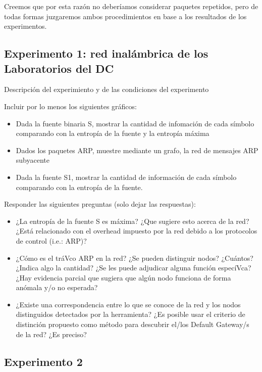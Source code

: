 \par Creemos que por esta razón no deberíamos considerar paquetes repetidos, pero de todas formas juzgaremos ambos procedimientos en base a los resultados de los experimentos.

\subsection{Experimento 1: red inalámbrica de los Laboratorios del DC}

Descripci\'on del experimiento y de las condiciones del experimento

Incluir por lo menos los siguientes gr\'aficos:

\begin{itemize}
	\item Dada la fuente binaria S, mostrar la cantidad de infomación de cada símbolo comparando con la entropía de la fuente y la entropía máxima
	\item Dados los paquetes ARP, muestre mediante un grafo, la red de mensajes ARP subyacente
	\item Dada la fuente S1, mostrar la cantidad de información de cada símbolo comparando con la entropía de la fuente.
\end{itemize}

Responder las siguientes preguntas (solo dejar las respuestas):

\begin{itemize}
	\item ¿La entropía de la fuente S es máxima? ¿Que sugiere esto acerca de la red? ¿Está relacionado con el overhead impuesto por la red debido a los protocolos de control (i.e.: ARP)?
	\item ¿Cómo es el tráVco ARP en la red? ¿Se pueden distinguir nodos? ¿Cuántos? ¿Indica algo la cantidad? ¿Se les puede adjudicar alguna función especíVca? ¿Hay evidencia parcial que sugiera que algún nodo funciona de forma anómala y/o no esperada?
	\item ¿Existe una correspondencia entre lo que se conoce de la red y los nodos distinguidos detectados por la herramienta? ¿Es posible usar el criterio de distinción propuesto como método para descubrir el/los Default Gateway/s de la red? ¿Es preciso?
\end{itemize}

\subsection{Experimento 2}

